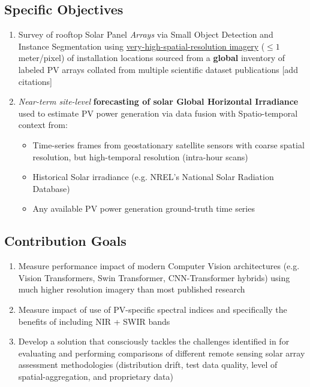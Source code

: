 \subsection{Specific Objectives}
    \begin{enumerate}
        \item Survey of rooftop Solar Panel \textit{Arrays} via Small Object Detection and Instance Segmentation using \href{https://www.maxar.com/maxar-intelligence/constellation}{very-high-spatial-resolution imagery} ($\leq1$ meter/pixel) of installation locations sourced from a \textbf{global} inventory of labeled PV arrays collated from multiple scientific dataset publications [add citations] 
        \item \textit{Near-term site-level} \textbf{forecasting of solar Global Horizontal  Irradiance} used to estimate PV power generation via data fusion with Spatio-temporal context from:
        \begin{itemize}
            \item Time-series frames from geostationary satellite sensors with coarse spatial resolution, but high-temporal resolution (intra-hour scans)
            \item Historical Solar irradiance (e.g. NREL's National Solar Radiation Database)
            \item Any available PV power generation ground-truth time series
        \end{itemize}
        
    \end{enumerate}
    
\subsection{Contribution Goals}
    \begin{enumerate}
        \item Measure performance impact of modern Computer Vision architectures (e.g. Vision Transformers, Swin Transformer, CNN-Transformer hybrids) using much higher resolution imagery than most published research 
        \item Measure impact of use of PV-specific spectral indices and specifically the benefits of including NIR + SWIR bands
        \item Develop a solution that consciously tackles the challenges identified in \cite{Hu_solar_array_pitfalls_2022} for evaluating and performing comparisons of different remote sensing solar array assessment methodologies (distribution drift, test data quality, level of spatial-aggregation, and proprietary data)
    \end{enumerate}
    \hfill

